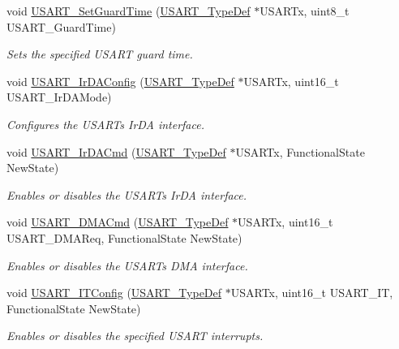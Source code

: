 \begin{DoxyCompactItemize}
void \hyperlink{group___u_s_a_r_t_gac4a35c6acd71ae7e0d67c1f03f0a8777}{U\+S\+A\+R\+T\+\_\+\+Set\+Guard\+Time} (\hyperlink{struct_u_s_a_r_t___type_def}{U\+S\+A\+R\+T\+\_\+\+Type\+Def} $\ast$U\+S\+A\+R\+Tx, uint8\+\_\+t U\+S\+A\+R\+T\+\_\+\+Guard\+Time)
\begin{DoxyCompactList}\small\item\em Sets the specified U\+S\+A\+RT guard time. \end{DoxyCompactList}\item 
void \hyperlink{group___u_s_a_r_t_ga81a0cd36199040bf6d266b57babd678e}{U\+S\+A\+R\+T\+\_\+\+Ir\+D\+A\+Config} (\hyperlink{struct_u_s_a_r_t___type_def}{U\+S\+A\+R\+T\+\_\+\+Type\+Def} $\ast$U\+S\+A\+R\+Tx, uint16\+\_\+t U\+S\+A\+R\+T\+\_\+\+Ir\+D\+A\+Mode)
\begin{DoxyCompactList}\small\item\em Configures the U\+S\+A\+RT\textquotesingle{}s Ir\+DA interface. \end{DoxyCompactList}\item 
void \hyperlink{group___u_s_a_r_t_gabff56ebb494fdfadcc6ef4fe9ac8dd24}{U\+S\+A\+R\+T\+\_\+\+Ir\+D\+A\+Cmd} (\hyperlink{struct_u_s_a_r_t___type_def}{U\+S\+A\+R\+T\+\_\+\+Type\+Def} $\ast$U\+S\+A\+R\+Tx, Functional\+State New\+State)
\begin{DoxyCompactList}\small\item\em Enables or disables the U\+S\+A\+RT\textquotesingle{}s Ir\+DA interface. \end{DoxyCompactList}\item 
void \hyperlink{group___u_s_a_r_t_ga902857f199ebfba21c63d725354af66f}{U\+S\+A\+R\+T\+\_\+\+D\+M\+A\+Cmd} (\hyperlink{struct_u_s_a_r_t___type_def}{U\+S\+A\+R\+T\+\_\+\+Type\+Def} $\ast$U\+S\+A\+R\+Tx, uint16\+\_\+t U\+S\+A\+R\+T\+\_\+\+D\+M\+A\+Req, Functional\+State New\+State)
\begin{DoxyCompactList}\small\item\em Enables or disables the U\+S\+A\+RT\textquotesingle{}s D\+MA interface. \end{DoxyCompactList}\item 
void \hyperlink{group___u_s_a_r_t_ga6d8f2dd1f34060ae7e386e3e5d56b6f6}{U\+S\+A\+R\+T\+\_\+\+I\+T\+Config} (\hyperlink{struct_u_s_a_r_t___type_def}{U\+S\+A\+R\+T\+\_\+\+Type\+Def} $\ast$U\+S\+A\+R\+Tx, uint16\+\_\+t U\+S\+A\+R\+T\+\_\+\+IT, Functional\+State New\+State)
\begin{DoxyCompactList}\small\item\em Enables or disables the specified U\+S\+A\+RT interrupts. \end{DoxyCompactList}\item 

\end{DoxyCompactItemize}
